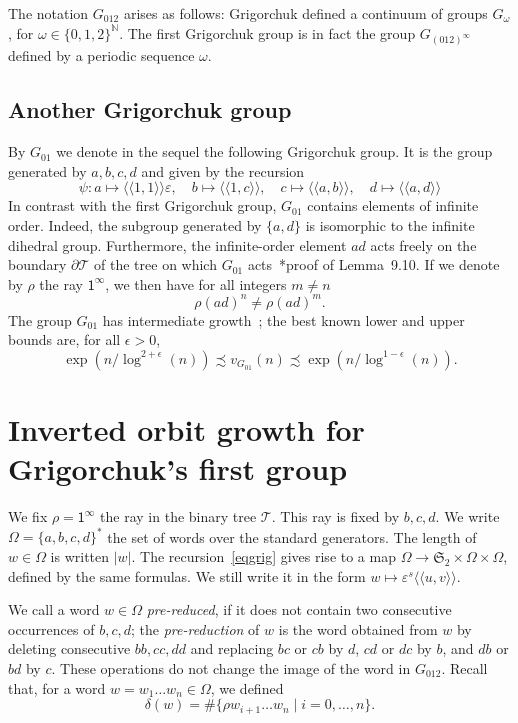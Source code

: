 \documentclass{amsart}
\newcommand\N{\mathbb{N}}
\newcommand\Grig{{G_{012}}}
\newcommand\Erschler{{G_{01}}}
\def\pair<#1>{{\langle\!\langle}#1{\rangle\!\rangle}}
\theoremstyle{definition}
\begin{document}
The notation $\Grig$ arises as follows: Grigorchuk defined a continuum
of groups $G_\omega$, for $\omega\in\{0,1,2\}^\N$. The first
Grigorchuk group is in fact the group $G_{(012)^\infty}$ defined by a
periodic sequence $\omega$.

\subsection{Another Grigorchuk group}
By $\Erschler$ we denote in the sequel the following Grigorchuk group.
It is the group generated by $a,b,c,d$ and given by the recursion
\begin{equation}\label{eqgrigdi}
\psi:a\mapsto\pair<1,1>\varepsilon,\quad b\mapsto\pair<1,c>,\quad
c\mapsto\pair<a,b>,\quad d\mapsto\pair<a,d>
\end{equation}
In contrast with the first Grigorchuk group, $\Erschler$ contains
elements of infinite order.  Indeed, the subgroup generated by
$\{a,d\}$ is isomorphic to the infinite dihedral group. Furthermore,
the infinite-order element $ad$ acts freely on the boundary
$\partial\mathcal T$ of the tree on which $\Erschler$
acts~\cite{grigorchuk:gdegree}*{proof of Lemma~9.10}.  If we denote by
$\rho$ the ray $\mathsf1^\infty$, we then have for all integers $m\ne
n$
\begin{equation}\label{eq:freediadicorbit}
  \rho (ad)^n \ne \rho (ad)^m.
\end{equation}
The group $\Erschler$ has intermediate
growth~\cite{erschler:boundarysubexp}; the best known lower and upper
bounds are, for all $\epsilon>0$,
\[\exp(n/\log^{2+\epsilon}(n))\precsim v_\Erschler(n)\precsim\exp(n/\log^{1-\epsilon}(n)).\]

\section{Inverted orbit growth for Grigorchuk's first group}
We fix $\rho=\mathsf1^\infty$ the ray in the binary tree $\mathcal T$.
This ray is fixed by $b,c,d$. We write $\Omega=\{a,b,c,d\}^*$ the set of
words over the standard generators. The length of $w\in \Omega$ is
written $|w|$.  The recursion~\eqref{eqgrig} gives rise to a map
$\Omega\to \mathfrak S_2\times \Omega\times \Omega$, defined by the same
formulas. We still write it in the form
$w\mapsto\varepsilon^s\pair<u,v>$.

We call a word $w\in \Omega$ \emph{pre-reduced}, if it does not
contain two consecutive occurrences of $b,c,d$; the
\emph{pre-reduction} of $w$ is the word obtained from $w$ by deleting
consecutive $bb,cc,dd$ and replacing $bc$ or $cb$ by $d$, $cd$ or $dc$
by $b$, and $db$ or $bd$ by $c$. These operations do not change the
image of the word in $\Grig$. Recall that, for a word $w=w_1\dots
w_n\in \Omega$, we defined
\[\delta(w)=\#\{\rho w_{i+1}\dots w_n\mid i=0,\dots,n\}.\]
\end{document}
